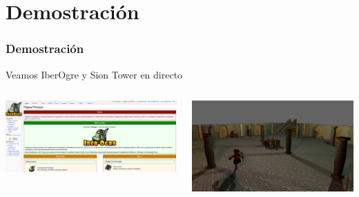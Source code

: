 \documentclass[green]{beamer}
\begin{document}
\section{Demostración}

\begin{frame}
\transdissolve
    \frametitle{Demostración}
    
    \begin{center}
	Veamos IberOgre y Sion Tower en directo
    \end{center}
    
    
    \begin{columns}[c]
    \column{175pt}
        
	\begin{center}
	    \includegraphics[scale=0.09]{img/captura-iberogre.png}
	\end{center}

    \column{175pt}
        
	\begin{center}
	    \includegraphics[scale=0.15]{img/captura-siontower.png}
	\end{center}
    \end{columns} 
\end{frame}
\end{document}
